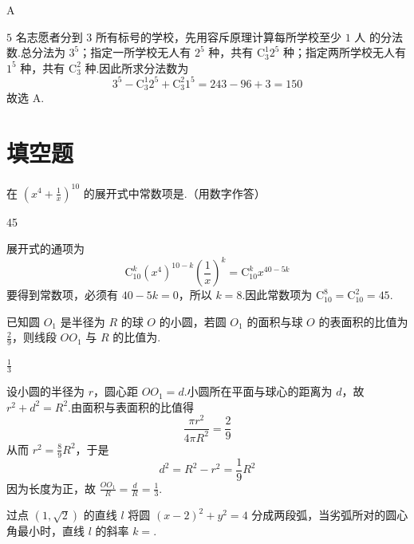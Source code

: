 \begin{answer}
A
\end{answer}

\begin{solution}
\(5\text{ 名}\)志愿者分到 \(3\text{ 所}\)有标号的学校，先用容斥原理计算每所学校至少 \(1\text{ 人}\) 的分法数.总分法为 \(3^{5}\)；指定一所学校无人有 \(2^{5}\) 种，共有 \(\mathrm C_{3}^{1}2^{5}\) 种；指定两所学校无人有 \(1^{5}\) 种，共有 \(\mathrm C_{3}^{2}\) 种.因此所求分法数为
\[
3^{5}-\mathrm C_{3}^{1}2^{5}+\mathrm C_{3}^{2}1^{5}=243-96+3=150
\]
故选 A.
\end{solution}

\section{填空题}
\begin{problem}
在 \(\left(x^{4} + \frac{1}{x}\right)^{10}\) 的展开式中常数项是\fillinblank{}.（用数字作答）
\end{problem}

\begin{answer}
45
\end{answer}

\begin{solution}
展开式的通项为
\[
\mathrm C_{10}^{k}(x^{4})^{10-k}\left(\frac1x\right)^{k}=\mathrm C_{10}^{k}x^{40-5k}
\]
要得到常数项，必须有 \(40-5k=0\)，所以 \(k=8\).因此常数项为
\(\mathrm C_{10}^{8}=\mathrm C_{10}^{2}=45\).
\end{solution}

\begin{problem}
已知圆 \(O_{1}\) 是半径为 \(R\) 的球 \(O\) 的小圆，若圆 \(O_{1}\) 的面积与球 \(O\) 的表面积的比值为 \(\frac{2}{9}\)，则线段 \(OO_{1}\) 与 \(R\) 的比值为\fillinblank{}.
\end{problem}

\begin{answer}
\(\frac{1}{3}\)
\end{answer}

\begin{solution}
设小圆的半径为 \(r\)，圆心距 \(OO_{1}=d\).小圆所在平面与球心的距离为 \(d\)，故
\(r^{2}+d^{2}=R^{2}\).由面积与表面积的比值得
\[
\frac{\pi r^{2}}{4\pi R^{2}}=\frac29
\]
从而 \(r^{2}=\frac89R^{2}\)，于是
\[
d^{2}=R^{2}-r^{2}=\frac19R^{2}
\]
因为长度为正，故 \(\frac{OO_{1}}{R}=\frac dR=\frac13\).
\end{solution}

\begin{problem}
过点 \((1, \sqrt{2})\) 的直线 \(l\) 将圆 \((x - 2)^2 + y^2 = 4\) 分成两段弧，当劣弧所对的圆心角最小时，直线 \(l\) 的斜率 \(k = \)\fillinblank{}.
\end{problem}

